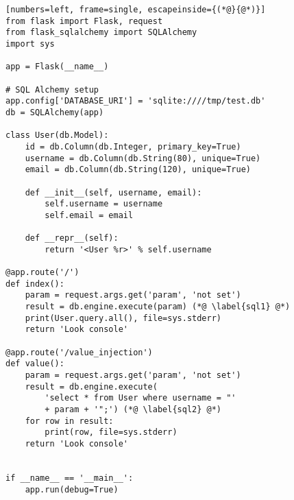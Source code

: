 \begin{lstlisting}[numbers=left, frame=single, escapeinside={(*@}{@*)}]
from flask import Flask, request
from flask_sqlalchemy import SQLAlchemy
import sys

app = Flask(__name__)

# SQL Alchemy setup
app.config['DATABASE_URI'] = 'sqlite:////tmp/test.db'
db = SQLAlchemy(app)

class User(db.Model):
    id = db.Column(db.Integer, primary_key=True)
    username = db.Column(db.String(80), unique=True)
    email = db.Column(db.String(120), unique=True)

    def __init__(self, username, email):
        self.username = username
        self.email = email

    def __repr__(self):
        return '<User %r>' % self.username    
    
@app.route('/')
def index():
    param = request.args.get('param', 'not set')
    result = db.engine.execute(param) (*@ \label{sql1} @*)
    print(User.query.all(), file=sys.stderr) 
    return 'Look console'

@app.route('/value_injection')
def value():
    param = request.args.get('param', 'not set')
    result = db.engine.execute(
        'select * from User where username = "'
        + param + '";') (*@ \label{sql2} @*)
    for row in result:
        print(row, file=sys.stderr)
    return 'Look console'


if __name__ == '__main__':
    app.run(debug=True)
\end{lstlisting}

